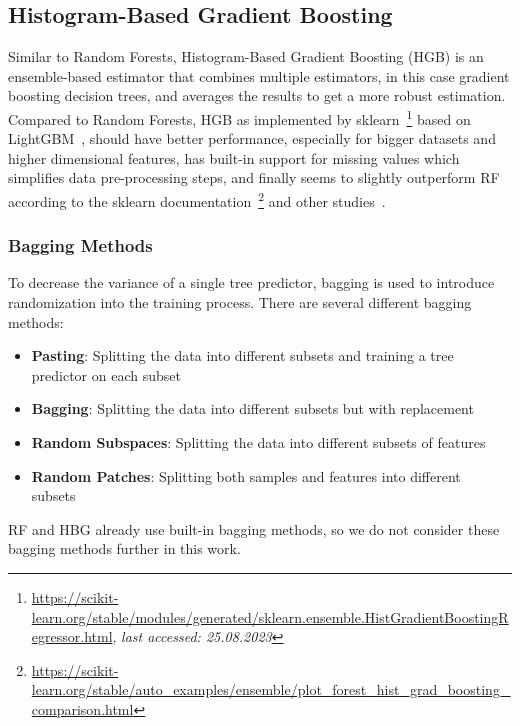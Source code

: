 \subsection{Histogram-Based Gradient Boosting}

Similar to Random Forests, Histogram-Based Gradient Boosting (HGB) is an ensemble-based estimator that combines multiple estimators, in this case gradient boosting decision trees, and averages the results to get a more robust estimation. Compared to Random Forests, HGB as implemented by sklearn~\footnote{\url{https://scikit-learn.org/stable/modules/generated/sklearn.ensemble.HistGradientBoostingRegressor.html}, \textit{last accessed: 25.08.2023}} based on LightGBM~\cite{ke2017lightgbm}, should have better performance, especially for bigger datasets and higher dimensional features, has built-in support for missing values which simplifies data pre-processing steps, and finally seems to slightly outperform RF according to the sklearn documentation~\footnote{\url{https://scikit-learn.org/stable/auto\_examples/ensemble/plot\_forest\_hist\_grad\_boosting\_comparison.html}} and other studies~\cite{apaydin2022evaluation}.

\subsubsection{Bagging Methods}

To decrease the variance of a single tree predictor, bagging is used to introduce randomization into the training process. There are several different bagging methods:

\begin{itemize}
    \item \textbf{Pasting}: Splitting the data into different subsets and training a tree predictor on each subset~\cite{breiman1999pasting}
    \item \textbf{Bagging}: Splitting the data into different subsets but with replacement~\cite{breiman1996bagging}
    \item \textbf{Random Subspaces}: Splitting the data into different subsets of features~\cite{ho1998random}
    \item \textbf{Random Patches}: Splitting both samples and features into different subsets~\cite{louppe2012ensembles}
\end{itemize}

RF and HBG already use built-in bagging methods, so we do not consider these bagging methods further in this work.

